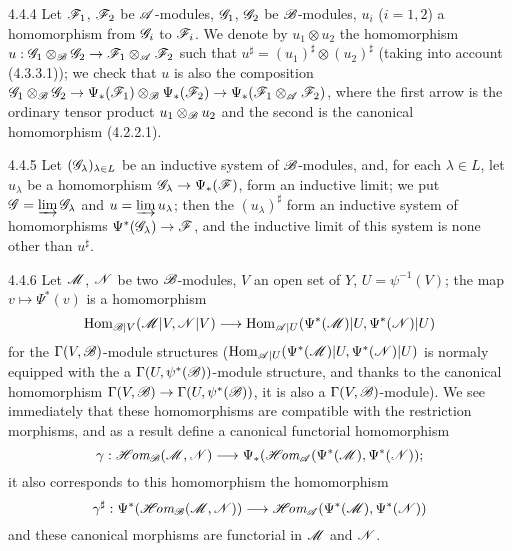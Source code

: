 \begin{env}{4.4.4}
\label{env-0.4.4.4}
Let $\mathscr{F}_1$, $\mathscr{F}_2$ be $\mathscr{A}$-modules, $\mathscr{G}_1$, $\mathscr{G}_2$ be $\mathscr{B}$-modules,
$u_i$ ($i=1,2$) a homomorphism from $\mathscr{G}_i$ to $\mathscr{F}_i$. We denote by $u_1\otimes u_2$
the homomorphism $u:\mathscr{G}_1\otimes_\mathscr{B}\mathscr{G}_2\to\mathscr{F}_1\otimes_\mathscr{A}\mathscr{F}_2$ such
that $u^\sharp=(u_1)^\sharp\otimes(u_2)^\sharp$ (taking into account (4.3.3.1)); we check
that $u$ is also the composition
$\mathscr{G}_1\otimes_\mathscr{B}\mathscr{G}_2\to\Psi_*(\mathscr{F}_1)\otimes_\mathscr{B}\Psi_*(\mathscr{F}_2)
\to\Psi_*(\mathscr{F}_1\otimes_\mathscr{A}\mathscr{F}_2)$, where the first arrow is the ordinary tensor
product $u_1\otimes_\mathscr{B}u_2$ and the second is the canonical homomorphism (4.2.2.1).
\end{env}

\begin{env}{4.4.5}
\label{env-0.4.4.5}
Let $(\mathscr{G}_\lambda)_{\lambda\in L}$ be an inductive system of
$\mathscr{B}$-modules, and, for each $\lambda\in L$, let $u_\lambda$ be a
homomorphism $\mathscr{G}_\lambda\to\Psi_*(\mathscr{F})$, form an inductive limit; we put
$\mathscr{G}=\varinjlim\mathscr{G}_\lambda$ and $u=\varinjlim u_\lambda$; then the
$(u_\lambda)^\sharp$ form an inductive system of homomorphisms
$\Psi^*(\mathscr{G}_\lambda)\to\mathscr{F}$, and the inductive limit of this system is
none other than $u^\sharp$.
\end{env}

\begin{env}{4.4.6}
\label{env-0.4.4.6}
Let $\mathscr{M}$, $\mathscr{N}$ be two $\mathscr{B}$-modules, $V$ an open set of $Y$,
$U=\psi^{-1}(V)$; the map $v\mapsto\Psi^*(v)$ is a homomorphism
\[
  {\mathop{\mathrm{Hom}}\nolimits}_{\mathscr{B}|V}(\mathscr{M}|V,\mathscr{N}|V)
  \longrightarrow{\mathop{\mathrm{Hom}}\nolimits}_{\mathscr{A}|U}(\Psi^*(\mathscr{M})|U,\Psi^*(\mathscr{N})|U)
\]
for the $\Gamma(V,\mathscr{B})$-module structures
(${\mathop{\mathrm{Hom}}\nolimits}_{\mathscr{A}|U}(\Psi^*(\mathscr{M})|U,\Psi^*(\mathscr{N})|U)$ is normaly equipped with the a
$\Gamma(U,\psi^*(\mathscr{B}))$-module structure, and thanks to the canonical homomorphism
 $\Gamma(V,\mathscr{B})\to\Gamma(U,\psi^*(\mathscr{B}))$, it is also a
$\Gamma(V,\mathscr{B})$-module). We see immediately that these homomorphisms are compatible with
the restriction morphisms, and as a result define a canonical functorial homomorphism
\[
  \gamma:\mathscr{H}\!\textit{om}_\mathscr{B}(\mathscr{M},\mathscr{N})
  \longrightarrow\Psi_*(\mathscr{H}\!\textit{om}_\mathscr{A}(\Psi^*(\mathscr{M}),\Psi^*(\mathscr{N}));
\]
it also corresponds to this homomorphism the homomorphism
\[
  \gamma^\sharp:\Psi^*(\mathscr{H}\!\textit{om}_\mathscr{B}(\mathscr{M},\mathscr{N}))
  \longrightarrow\mathscr{H}\!\textit{om}_\mathscr{A}(\Psi^*(\mathscr{M}),\Psi^*(\mathscr{N}))
\]
and these canonical morphisms are functorial in $\mathscr{M}$ and $\mathscr{N}$.
\end{env}


